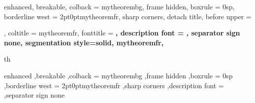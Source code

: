 {%
	enhanced,
	breakable,
	colback = mytheorembg,
	frame hidden,
	boxrule = 0sp,
	borderline west = {2pt}{0pt}{mytheoremfr},
	sharp corners,
	detach title,
	before upper = \tcbtitle\par\smallskip,
	coltitle = mytheoremfr,
	fonttitle = \bfseries\sffamily,
	description font = \mdseries,
	separator sign none,
	segmentation style={solid, mytheoremfr},
}
{th}


{%
	enhanced
	,breakable
	,colback = mytheorembg
	,frame hidden
	,boxrule = 0sp
	,borderline west = {2pt}{0pt}{mytheoremfr}
	,sharp corners
	,description font = \mdseries
	,separator sign none
}
%
%
%
%
%
